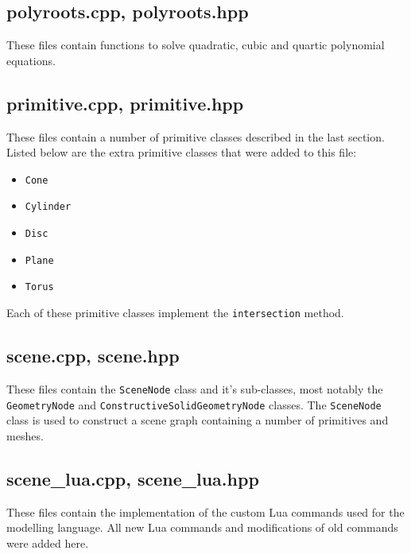 \subsection*{polyroots.cpp, polyroots.hpp}
These files contain functions to solve quadratic, cubic and quartic polynomial
equations.

\subsection*{primitive.cpp, primitive.hpp}
These files contain a number of primitive classes described in the last section.
Listed below are the extra primitive classes that were added to this file:
\begin{itemize}
  \item \verb|Cone|
  \item \verb|Cylinder|
  \item \verb|Disc|
  \item \verb|Plane|
  \item \verb|Torus|
\end{itemize}
Each of these primitive classes implement the \verb|intersection| method.

\subsection*{scene.cpp, scene.hpp}
These files contain the \verb|SceneNode| class and it's sub-classes, most 
notably the \verb|GeometryNode| and \verb|ConstructiveSolidGeometryNode| 
classes. The \verb|SceneNode| class is used to construct a scene graph
containing a number of primitives and meshes.

\subsection*{scene\_lua.cpp, scene\_lua.hpp}
These files contain the implementation of the custom Lua commands used for the
modelling language. All new Lua commands and modifications of old commands were
added here.

